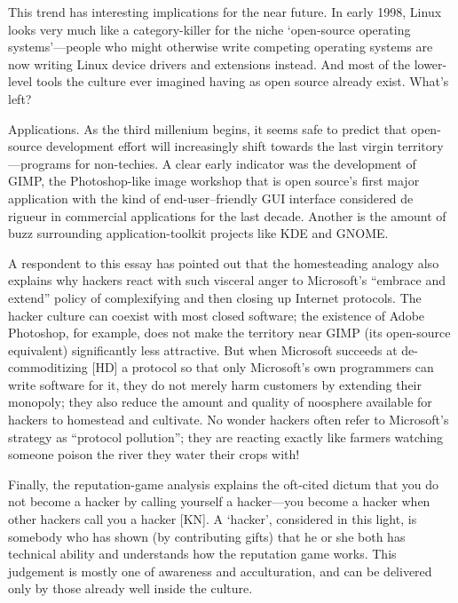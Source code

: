 This trend has interesting implications for the near future.  In early 1998,
Linux looks very much like a category-killer for the niche `open-source
operating systems'—people who might otherwise write competing operating systems
are now writing Linux device drivers and extensions instead.  And most of the
lower-level tools the culture ever imagined having as open source already exist.
What's left?

Applications.  As the third millenium begins, it seems safe to predict that
open-source development effort will increasingly shift towards the last virgin
territory—programs for non-techies.  A clear early indicator was the development
of GIMP, the Photoshop-like image workshop that is open source's first major
application with the kind of end-user–friendly GUI interface considered de
rigueur in commercial applications for the last decade.  Another is the amount
of buzz surrounding application-toolkit projects like KDE and GNOME.

A respondent to this essay has pointed out that the homesteading analogy also
explains why hackers react with such visceral anger to Microsoft's ``embrace and
extend'' policy of complexifying and then closing up Internet protocols.  The
hacker culture can coexist with most closed software; the existence of Adobe
Photoshop, for example, does not make the territory near GIMP (its open-source
equivalent) significantly less attractive.  But when Microsoft succeeds at
de-commoditizing [HD] a protocol so that only Microsoft's own programmers can
write software for it, they do not merely harm customers by extending their
monopoly; they also reduce the amount and quality of noosphere available for
hackers to homestead and cultivate.  No wonder hackers often refer to
Microsoft's strategy as ``protocol pollution''; they are reacting exactly like
farmers watching someone poison the river they water their crops with!

Finally, the reputation-game analysis explains the oft-cited dictum that you do
not become a hacker by calling yourself a hacker—you become a hacker when other
hackers call you a hacker [KN].  A `hacker', considered in this light, is
somebody who has shown (by contributing gifts) that he or she both has technical
ability and understands how the reputation game works.  This judgement is mostly
one of awareness and acculturation, and can be delivered only by those already
well inside the culture.
